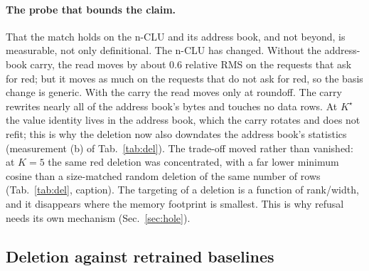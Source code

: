 \documentclass{article} %
\newcommand{\Kstar}{\ensuremath{K^{\star}}}
\begin{document}
\paragraph{The probe that bounds the claim.} That the match holds on the n-CLU and its address book,
and not beyond, is measurable, not only definitional.
The n-CLU has changed. Without the address-book carry, the read moves by about 0.6 relative RMS on
the requests that ask for red; but it moves as much on the requests that do not ask
for red, so the basis change is generic. With the carry the read moves
only at roundoff. The carry rewrites nearly all of the
address book's bytes and touches no data rows. %
At $\Kstar$ the value identity
lives in the address book, which the carry rotates and does not refit; this is why the deletion
now also downdates the address book's statistics (measurement (b) of Tab.~\ref{tab:del}). The trade-off moved
rather than vanished: at $K=5$ the same red deletion was concentrated,
with a far lower minimum cosine than a size-matched random deletion of the same number of
rows (Tab.~\ref{tab:del}, caption). %
The targeting of a deletion is a function of rank/width, and it disappears where the memory footprint
is smallest. This is why refusal needs its own mechanism (Sec.~\ref{sec:hole}).

\subsection{Deletion against retrained baselines}
\label{sec:del-comparators}
\end{document}
